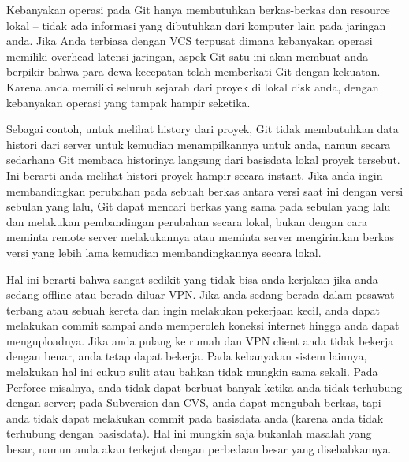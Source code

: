  \par
\noindent 
{\fontsize{14pt}{14pt}\selectfont Kebanyakan operasi pada Git hanya membutuhkan berkas-berkas dan resource lokal – tidak ada informasi yang dibutuhkan dari komputer lain pada jaringan anda. Jika Anda terbiasa dengan VCS terpusat dimana kebanyakan operasi memiliki overhead latensi jaringan, aspek Git satu ini akan membuat anda berpikir bahwa para dewa kecepatan telah memberkati Git dengan kekuatan. Karena anda memiliki seluruh sejarah dari proyek di lokal disk anda, dengan kebanyakan operasi yang tampak hampir seketika. \\} \par
\noindent 
{\fontsize{14pt}{14pt}\selectfont Sebagai contoh, untuk melihat history dari proyek, Git tidak membutuhkan data histori dari server untuk kemudian menampilkannya untuk anda, namun secara sedarhana Git membaca historinya langsung dari basisdata lokal proyek tersebut. Ini berarti anda melihat histori proyek hampir secara instant. Jika anda ingin membandingkan perubahan pada sebuah berkas antara versi saat ini dengan versi sebulan yang lalu, Git dapat mencari berkas yang sama pada sebulan yang lalu dan melakukan pembandingan perubahan secara lokal, bukan dengan cara meminta remote server melakukannya atau meminta server mengirimkan berkas versi yang lebih lama kemudian membandingkannya secara lokal. \\} \par
\noindent 
{\fontsize{14pt}{14pt}\selectfont Hal ini berarti bahwa sangat sedikit yang tidak bisa anda kerjakan jika anda sedang offline atau berada diluar VPN. Jika anda sedang berada dalam pesawat terbang atau sebuah kereta dan ingin melakukan pekerjaan kecil, anda dapat melakukan commit sampai anda memperoleh koneksi internet hingga anda dapat menguploadnya. Jika anda pulang ke rumah dan VPN client anda tidak bekerja dengan benar, anda tetap dapat bekerja. Pada kebanyakan sistem lainnya, melakukan hal ini cukup sulit atau bahkan tidak mungkin sama sekali. Pada Perforce misalnya, anda tidak dapat berbuat banyak ketika anda tidak terhubung dengan server; pada Subversion dan CVS, anda dapat mengubah berkas, tapi anda tidak dapat melakukan commit pada basisdata anda (karena anda tidak terhubung dengan basisdata). Hal ini mungkin saja bukanlah masalah yang besar, namun anda akan terkejut dengan perbedaan besar yang disebabkannya. \\} \par

